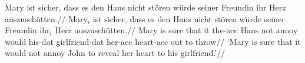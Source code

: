 \begingl ^^M\glpreamble Mary ist sicher, dass es den Hans nicht st\"oren w\"urde^^Mseiner Freundin ihr Herz auszusch\"utten.//^^M\gla Mary$_i$ ist sicher, dass es den Hans nicht st\"oren w\"urde^^Mseiner Freundin ihr$_i$ Herz auszusch\"utten.//^^M\glb Mary is sure that it the-{\sc acc} Hans not annoy would^^Mhis-{\sc dat} girlfriend-{\sc dat} her-{\sc acc} heart-{\sc acc} {out to^^Mthrow}//^^M\glft `Mary is sure that it would not annoy John to reveal her^^Mheart to his girlfriend.'//^^M\endgl 
